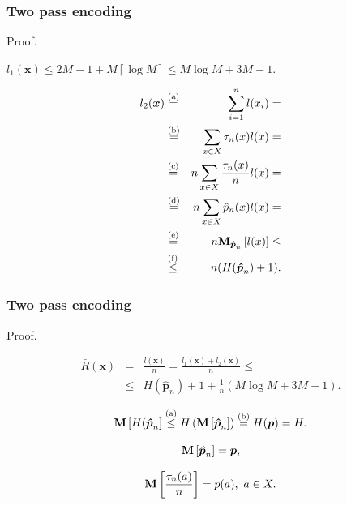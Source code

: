 \documentclass[14pt]{beamer}
\renewcommand{\vec}[1]{\ensuremath{\boldsymbol{#1}}}
\begin{document}
\begin{frame}
\frametitle{Two pass encoding}
Proof.
\begin{itemize}    

\small{

    \item
    \label{eq3_18} $l_1 (\vec x) \le 2M - 1 + M\left\lceil {\log M} \right\rceil \le M\log M + 3M - 1.$
}
\footnotesize {
    \item 
    \begin{eqnarray}
    \label{eq3_19}%
    l_2 (\vec x) &\stackrel{\rm (a)}{=}& \sum\limits_{i = 1}^n l(x_i )
    =\nonumber\\
    &\stackrel{\rm (b)}{=}& \sum\limits_{x \in X} \tau _n (x)l(x)=\nonumber\\
    &\stackrel{\rm (c)}{=}& n \sum\limits_{x \in X} \frac{\tau _n
    (x)}{n}l(x) =\nonumber\\
    &\stackrel{\rm (d)}{=}&  n\sum\limits_{x \in X} \hat {p}_n (x)l(x)= \nonumber\\
    &\stackrel{\rm (e)}{=}& n {\rm {\bf M}}_{\vec {\hat {p}}_n}\left[
    {l(x)} \right]\le \nonumber\\
    &\stackrel{\rm (f)}{\le}& n(H(\vec {\hat {p}}_n ) + 1).
    \end{eqnarray}
}

\end{itemize}
\end{frame}


\begin{frame}
\frametitle{Two pass encoding}
Proof.
\begin{itemize}    
\small{

    \item
    \begin{eqnarray}
    \label{eq3_20}
    \bar {R}(\vec x) &=& \frac{l(\vec x)}{n} = \frac{l_1
    (\vec x) + l_2 (\vec x)}{n} \le \\
    &\le& H(\vec {\hat {p}}_n) + 1 + \frac{1}{n}\left( {M\log M + 3M -
    1} \right).
    \end{eqnarray}
    
    \item
    \begin{equation}
    \label{eq3_21} {\rm {\bf M}}\left[ {H(\vec {\hat {p}}_n} \right]
    \stackrel{\rm (a)}{\le} H\left( {{\rm {\bf M}}\left[\vec {\hat
    {p}}_n \right]} \right) \stackrel{\rm (b)}{=} H(\vec p)=H.
    \end{equation}
    
    
    \item
    \begin{equation}
    \label{eq3_22} {\rm {\bf M}}\left[ \vec {\hat {p}}_n \right] = \vec p,
    \end{equation}
    
    \item 
    \[
    {\rm {\bf M}}\left[ {\frac{\tau _n (a)}{n}} \right] = p(a),\mbox{ }a \in X.
    \]
}
\end{itemize}
\end{frame}
\end{document}
